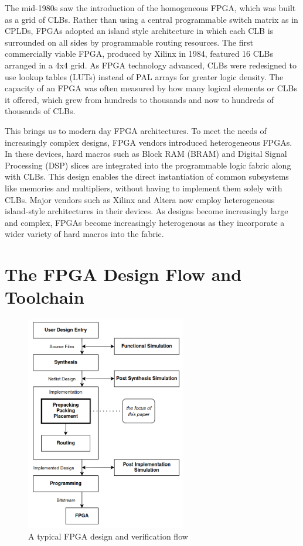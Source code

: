 \documentclass[twocolumn]{article}
\begin{document}
    The mid-1980s saw the introduction of the homogeneous FPGA, which was built as a grid of CLBs. 
    Rather than using a central programmable switch matrix as in CPLDs, FPGAs adopted an island style architecture in which each CLB is surrounded on all sides by programmable routing resources. 
    The first commercially viable FPGA, produced by Xilinx in 1984, featured 16 CLBs arranged in a 4x4 grid. 
    As FPGA technology advanced, CLBs were redesigned to use lookup tables (LUTs) instead of PAL arrays for greater logic density. 
    The capacity of an FPGA was often measured by how many logical elements or CLBs it offered, which grew from hundreds to thousands and now to hundreds of thousands of CLBs.

    This brings us to modern day FPGA architectures.
    To meet the needs of increasingly complex designs, FPGA vendors introduced heterogeneous FPGAs. 
    In these devices, hard macros such as Block RAM (BRAM) and Digital Signal Processing (DSP) slices are integrated into the programmable logic fabric along with CLBs. 
    This design enables the direct instantiation of common subsystems like memories and multipliers, without having to implement them solely with CLBs. 
    Major vendors such as Xilinx and Altera now employ heterogeneous island-style architectures in their devices. 
    As designs become increasingly large and complex, FPGAs become increasingly heterogenous as they incorporate a wider variety of hard macros into the fabric.

\section{The FPGA Design Flow and Toolchain}
    
    \begin{figure}
        \centering
        \includegraphics[width=7.0cm]{figures/design_flow.png}
        \caption{A typical FPGA design and verification flow}
        \label{fig:design_flow}
    \end{figure}
\end{document}
